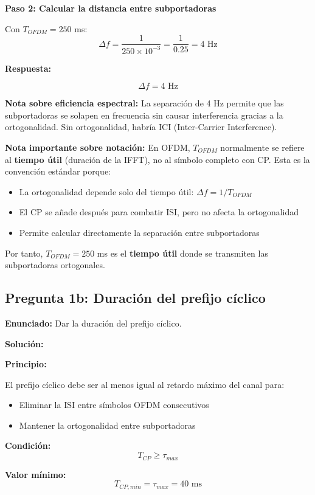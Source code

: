 \documentclass[11pt,a4paper]{article}
\begin{document}
\textbf{Paso 2: Calcular la distancia entre subportadoras}

Con $T_{OFDM} = 250$ ms:
\[
\Delta f = \frac{1}{250 \times 10^{-3}} = \frac{1}{0.25} = 4 \text{ Hz}
\]

\textbf{Respuesta:}

\[
\boxed{\Delta f = 4 \text{ Hz}}
\]

\textbf{Nota sobre eficiencia espectral:}
La separación de 4 Hz permite que las subportadoras se solapen en frecuencia sin causar interferencia gracias a la ortogonalidad. Sin ortogonalidad, habría ICI (Inter-Carrier Interference).

\textbf{Nota importante sobre notación:} En OFDM, $T_{OFDM}$ normalmente se refiere al \textbf{tiempo útil} (duración de la IFFT), no al símbolo completo con CP. Esta es la convención estándar porque:
\begin{itemize}
    \item La ortogonalidad depende solo del tiempo útil: $\Delta f = 1/T_{OFDM}$
    \item El CP se añade después para combatir ISI, pero no afecta la ortogonalidad
    \item Permite calcular directamente la separación entre subportadoras
\end{itemize}

Por tanto, $T_{OFDM} = 250$ ms es el \textbf{tiempo útil} donde se transmiten las subportadoras ortogonales.

\subsection*{Pregunta 1b: Duración del prefijo cíclico}

\textbf{Enunciado:} Dar la duración del prefijo cíclico.

\vspace{0.3cm}
\textbf{Solución:}

\textbf{Principio:}

El prefijo cíclico debe ser al menos igual al retardo máximo del canal para:
\begin{itemize}
    \item Eliminar la ISI entre símbolos OFDM consecutivos
    \item Mantener la ortogonalidad entre subportadoras
\end{itemize}

\textbf{Condición:}
\[
T_{CP} \geq \tau_{max}
\]

\textbf{Valor mínimo:}
\[
T_{CP,min} = \tau_{max} = 40 \text{ ms}
\]
\end{document}
